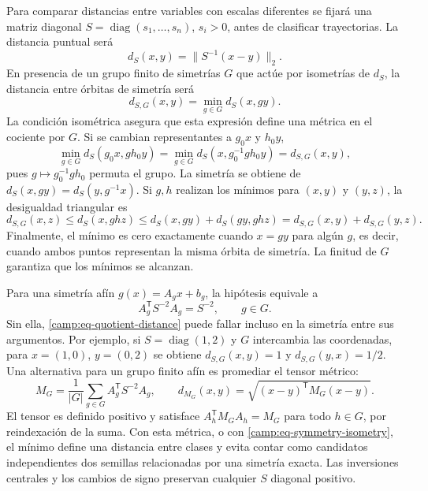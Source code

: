 Para comparar distancias entre variables con escalas diferentes se fijará una
matriz diagonal \(S=\operatorname{diag}(s_1,\ldots,s_n)\), \(s_i>0\), antes de
clasificar trayectorias. La distancia puntual será
\begin{equation}
 d_S(x,y)=\lVert S^{-1}(x-y)\rVert_2.
 \label{camp:eq-scaled-distance}
\end{equation}
En presencia de un grupo finito de simetrías \(G\) que actúe por isometrías
de \(d_S\), la distancia entre órbitas de simetría será
\begin{equation}
 d_{S,G}(x,y)=\min_{g\in G}d_S(x,g y).
 \label{camp:eq-quotient-distance}
\end{equation}
La condición isométrica asegura que esta expresión define una métrica en el
cociente por \(G\). Si se cambian representantes a \(g_0x\) y \(h_0y\),
\[
 \min_{g\in G}d_S(g_0x,gh_0y)
 =\min_{g\in G}d_S(x,g_0^{-1}gh_0y)=d_{S,G}(x,y),
\]
pues \(g\mapsto g_0^{-1}gh_0\) permuta el grupo. La simetría se obtiene de
\(d_S(x,gy)=d_S(y,g^{-1}x)\). Si \(g,h\) realizan los mínimos para
\((x,y)\) y \((y,z)\), la desigualdad triangular es
\[
 d_{S,G}(x,z)\leq d_S(x,ghz)
 \leq d_S(x,gy)+d_S(gy,ghz)
 =d_{S,G}(x,y)+d_{S,G}(y,z).
\]
Finalmente, el mínimo es cero exactamente cuando \(x=gy\) para algún
\(g\), es decir, cuando ambos puntos representan la misma órbita de simetría.
La finitud de \(G\) garantiza que los mínimos se alcanzan.

Para una simetría afín \(g(x)=A_gx+b_g\), la hipótesis equivale a
\begin{equation}
 A_g^{\mathsf T}S^{-2}A_g=S^{-2},\qquad g\in G.
 \label{camp:eq-symmetry-isometry}
\end{equation}
Sin ella, \cref{camp:eq-quotient-distance} puede fallar incluso en la
simetría entre sus argumentos. Por ejemplo, si \(S=\operatorname{diag}(1,2)\)
y \(G\) intercambia las coordenadas, para \(x=(1,0)\), \(y=(0,2)\) se obtiene
\(d_{S,G}(x,y)=1\) y \(d_{S,G}(y,x)=1/2\). Una alternativa para un grupo
finito afín es promediar el tensor métrico:
\begin{equation}
 M_G=\frac1{|G|}\sum_{g\in G}A_g^{\mathsf T}S^{-2}A_g,
 \qquad d_{M_G}(x,y)=\sqrt{(x-y)^{\mathsf T}M_G(x-y)}.
 \label{camp:eq-symmetry-averaged-metric}
\end{equation}
El tensor es definido positivo y satisface
\(A_h^{\mathsf T}M_GA_h=M_G\) para todo \(h\in G\), por reindexación de la
suma. Con esta métrica, o con \cref{camp:eq-symmetry-isometry}, el mínimo
define una distancia entre clases y evita contar como candidatos independientes
dos semillas relacionadas por una simetría exacta. Las inversiones centrales y
los cambios de signo preservan cualquier \(S\) diagonal positivo.

